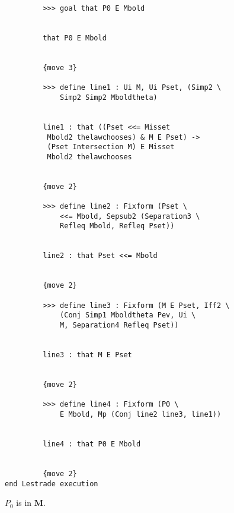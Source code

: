 \documentclass[12pt]{article}
\begin{document}
\begin{verbatim}
         >>> goal that P0 E Mbold


         that P0 E Mbold


         {move 3}

         >>> define line1 : Ui M, Ui Pset, (Simp2 \
             Simp2 Simp2 Mboldtheta)


         line1 : that ((Pset <<= Misset 
          Mbold2 thelawchooses) & M E Pset) -> 
          (Pset Intersection M) E Misset 
          Mbold2 thelawchooses


         {move 2}

         >>> define line2 : Fixform (Pset \
             <<= Mbold, Sepsub2 (Separation3 \
             Refleq Mbold, Refleq Pset))


         line2 : that Pset <<= Mbold


         {move 2}

         >>> define line3 : Fixform (M E Pset, Iff2 \
             (Conj Simp1 Mboldtheta Pev, Ui \
             M, Separation4 Refleq Pset))


         line3 : that M E Pset


         {move 2}

         >>> define line4 : Fixform (P0 \
             E Mbold, Mp (Conj line2 line3, line1))


         line4 : that P0 E Mbold


         {move 2}
end Lestrade execution
\end{verbatim}

$P_0$ is in {\bf M}.
\end{document}
